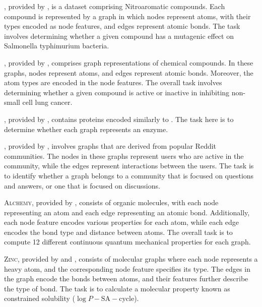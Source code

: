 \mutag, provided by \cite{Debnath1991}, is a dataset comprising Nitroaromatic compounds. Each compound is represented by a graph in which nodes represent atoms, with their types encoded as node features, and edges represent atomic bonds. The task involves determining whether a given compound has a mutagenic effect on Salmonella typhimurium bacteria.\par\medskip

\nci, provided by \cite{Wale2008}, comprises graph representations of chemical compounds. In these graphs, nodes represent atoms, and edges represent atomic bonds. Moreover, the atom types are encoded in the node features. The overall task involves determining whether a given compound is active or inactive in inhibiting non-small cell lung cancer.\par\medskip

\proteins, provided by \cite{Borgwardt2005}, contains proteins encoded similarly to \enzymes. The task here is to determine whether each graph represents an enzyme.\par\medskip

\reddit, provided by \cite{Yanardag2015}, involves graphs that are derived from popular Reddit communities. The nodes in these graphs represent users who are active in the community, while the edges represent interactions between the users. The task is to identify whether a graph belongs to a community that is focused on questions and answers, or one that is focused on discussions.\par\medskip

\textsc{Alchemy}, provided by \cite{Chen2019alchemy}, consists of organic molecules, with each node representing an atom and each edge representing an atomic bond. Additionally, each node feature encodes various properties for each atom, while each edge encodes the bond type and distance between atoms. The overall task is to compute 12 different continuous quantum mechanical properties for each graph.\par\medskip

\textsc{Zinc}, provided by \cite{Bresson2019} and \cite{Irwin2012}, consists of molecular graphs where each node represents a heavy atom, and the corresponding node feature specifies its type. The edges in the graph encode the bonds between atoms, and their features further describe the type of bond. The task is to calculate a molecular property known as constrained solubility ($\log P - \text{SA} - \text{cycle}$).\par\medskip

